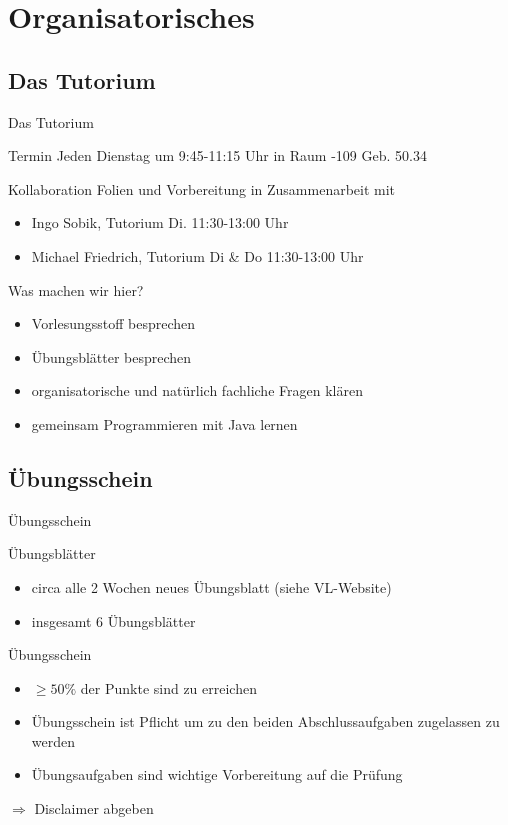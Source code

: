 \documentclass[18pt]{beamer}
\begin{document}
\section{Organisatorisches}
\subsection{Das Tutorium}
\begin{frame}{Das Tutorium}
\begin{block}{Termin}
	Jeden Dienstag um 9:45-11:15 Uhr in Raum -109 Geb. 50.34
\end{block}
\begin{block}{Kollaboration}
	Folien und Vorbereitung in Zusammenarbeit mit
	\begin{itemize}
		\item Ingo Sobik, Tutorium Di. 11:30-13:00 Uhr
		\item Michael Friedrich, Tutorium Di \& Do 11:30-13:00 Uhr
	\end{itemize}
\end{block}
\begin{block}{Was machen wir hier?}
	\begin{itemize}
		\item Vorlesungsstoff besprechen
		\item Übungsblätter besprechen
		\item organisatorische und natürlich fachliche Fragen klären
		\item gemeinsam Programmieren mit Java lernen
	\end{itemize}
\end{block}
\end{frame}

\subsection{Übungsschein}
\begin{frame}{Übungsschein}
	\begin{block}{Übungsblätter}
		\begin{itemize}
			\item circa alle 2 Wochen neues Übungsblatt (siehe VL-Website)
			\item insgesamt 6 Übungsblätter
		\end{itemize}
	\end{block}
	\pause
	\begin{block}{Übungsschein}
		\begin{itemize}
			\item $\geq 50\%$ der Punkte sind zu erreichen
			\item Übungsschein ist Pflicht um zu den beiden Abschlussaufgaben zugelassen zu werden
			\item Übungsaufgaben sind wichtige Vorbereitung auf die Prüfung
		\end{itemize}
	\end{block}
	$\Rightarrow$ Disclaimer abgeben
\end{frame}
\end{document}
